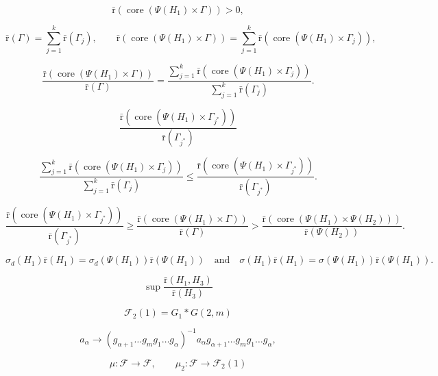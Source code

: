 \documentclass[10pt, reqno]{article}
\begin{document}
$$
{\bar {\mathrm{r}}}( \operatorname{core} (  \Psi(H_1) \times \Gamma )) >0 ,
$$

$$
{\bar {\mathrm{r}}}(\Gamma) = \sum_{j=1}^k {\bar {\mathrm{r}}}(\Gamma_j) , \qquad   {\bar {\mathrm{r}}}( \operatorname{core} (  \Psi(H_1) \times \Gamma )) = \sum_{j=1}^k {\bar {\mathrm{r}}}( \operatorname{core} (  \Psi(H_1) \times \Gamma_j )) ,
$$

\begin{equation}\label{e53}
\frac{{\bar {\mathrm{r}}}( \operatorname{core} (  \Psi(H_1) \times \Gamma   ))  }{  {\bar {\mathrm{r}}}(\Gamma ) } =  \frac{ \sum_{j=1}^k {\bar {\mathrm{r}}}( \operatorname{core} (  \Psi(H_1) \times \Gamma_j )) }{     \sum_{j=1}^k {\bar {\mathrm{r}}}(  \Gamma_j )      } .
\end{equation}

$$
\frac{  {\bar {\mathrm{r}}}( \operatorname{core} ( \Psi(H_1) \times \Gamma_{j^*} )) } {  {\bar {\mathrm{r}}}( \Gamma_{j^*} )      }
$$

$$
 \frac{ \sum_{j=1}^k {\bar {\mathrm{r}}}( \operatorname{core} (  \Psi(H_1) \times \Gamma_j )) }{     \sum_{j=1}^k {\bar {\mathrm{r}}}(  \Gamma_j )      }
  \le     \frac{  {\bar {\mathrm{r}}}( \operatorname{core} ( \Psi(H_1) \times \Gamma_{j^*} )) } {  {\bar {\mathrm{r}}}( \Gamma_{j^*} )      } .
  $$

$$
 \frac{  {\bar {\mathrm{r}}}( \operatorname{core} ( \Psi(H_1) \times \Gamma_{j^*} )) } {  {\bar {\mathrm{r}}}( \Gamma_{j^*} )      }  \ge
  \frac{  {\bar {\mathrm{r}}}( \operatorname{core} ( \Psi(H_1) \times \Gamma)) } {  {\bar {\mathrm{r}}}( \Gamma ) } >
  \frac{  {\bar {\mathrm{r}}}( \operatorname{core} ( \Psi(H_1) \times \Psi(H_2))) } {  {\bar {\mathrm{r}}}( \Psi(H_2) ) } .
  $$

$$
\sigma_d(H_1){\bar {\mathrm{r}}}(H_1 )   = \sigma_d( \Psi(H_1)){\bar {\mathrm{r}}}(\Psi(H_1)) \quad \mbox{and}  \quad
\sigma(H_1){\bar {\mathrm{r}}}(H_1) =  \sigma( \Psi(H_1)) {\bar {\mathrm{r}}}(\Psi(H_1)).
$$

$$\sup \frac{ {\bar {\mathrm{r}}}(   H_1, H_3  )  }{  {\bar {\mathrm{r}}}(H_3 ) }$$

$$
{\mathcal{F}}_2(1) =   G_1 *  G(2, m)
$$

\begin{equation}\label{map2}
a_{\alpha} \to
  (g_{{\alpha}+1} \ldots  g_{m}  g_{1} \ldots  g_{\alpha})^{-1}  a_{\alpha}   g_{{\alpha} +1} \ldots  g_{m}  g_{1} \ldots   g_{\alpha}   ,
\end{equation}

$$
 \mu : {\mathcal{F}} \to {\mathcal{F}} , \qquad \mu_2 : {\mathcal{F}} \to  {\mathcal{F}}_2(1)
 $$
\end{document}
